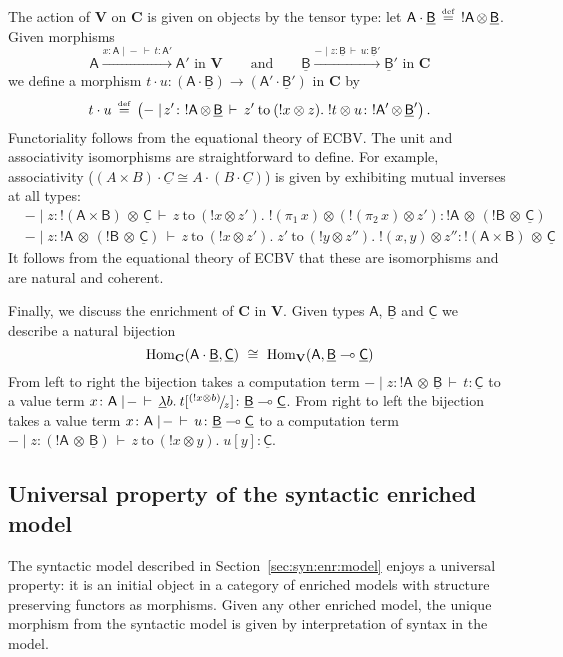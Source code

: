 \documentclass{LMCS}
\newcommand{\comptype}[1]{\underline{#1}}
\newcommand{\linlambda}{\comptype{\lambda}}
\newcommand{\co}{\colon}
\newcommand{\VA}{\mathsf{A}}
\newcommand{\VB}{\mathsf{B}}
\newcommand{\CB}{\comptype{\mathsf{B}}}
\newcommand{\CC}{\comptype{\mathsf{C}}}
\newcommand{\tensor}{\otimes}
\newcommand{\ltensortype}[2]{{!} #1 \, {\tensor} \, #2}
\newcommand{\llambda}{\linlambda}
\newcommand{\llam}[3]{\llambda #1.\: #3}
\newcommand{\ltensorterm}[2]{{!  #1} \tensor #2}
\newcommand{\letdot}[4]{{#3}\:\mathrm{to}\:{(\ltensorterm{#1}{#2})}.\;#4}
\newcommand{\rIn}[2]{#1 \colon  #2}
\newcommand{\aj}[4]{#1 \mid  \! #2 \, \vdash \, \rIn{#3}{#4}}
\newcommand{\tj}[3]{\aj{#1}{{-}}{#2}{#3}}
\newcommand{\VCat}{\fixedcatfont{V}} \newcommand{\CCat}{\fixedcatfont{C}} \newcommand{\DCat}{\fixedcatfont{D}}
\newcommand{\ltensor}[2]{#1 \cdot #2}
\newcommand{\fixedcatfont}{\mathbf}
\newcommand{\algC}{\underline{C}}
\newcommand{\defeq}{\mathrel{\,\stackrel{\mbox{\tiny{$\mathrm{def}$}}}=\,}}
\newcommand{\eecprojb}[2]{(\pi_{#1}\,#2)}
\newcommand{\sub}[3]{#1[^{#2}\!/\!_{#3}]}
\begin{document}
The action of $\VCat$ on $\CCat$ is given on objects by the tensor type: 
let $\ltensor \VA\CB\defeq \ltensortype\VA\CB$.
Given morphisms 
\[\VA\xrightarrow{\tj {x\co\VA}t{\VA'}}\VA'\text{ in $\VCat$}
\qquad\text{and}\qquad
\CB\xrightarrow{\aj-{z\co\CB}u{\CB'}}\CB'\text{ in $\CCat$}\]
we define a morphism $\ltensor t u:(\ltensor \VA\CB)\to(\ltensor {\VA'}{\CB'})$
in $\CCat$ by
\[\ltensor t u\defeq \left(\aj-{z'\co{\ltensortype \VA\CB}}{\letdot x{z}{z'}{\ltensorterm t u}}{\ltensortype{\VA'}{\CB'}}\right)\text.\]
Functoriality follows from the equational theory of ECBV.
The unit and associativity isomorphisms are straightforward to define.
For example, associativity ($\ltensor {(A\times B)}\algC\cong \ltensor A{(\ltensor B \algC)}$) is given by exhibiting
 mutual inverses at all types:
\begin{align*}
&\aj-{z\co{\ltensortype{(\VA\times \VB)}\CC}}
{\letdot x{z'} z {\ltensorterm{\eecprojb1x}{(\ltensorterm{\eecprojb2x}{z'})}}}
{\ltensortype \VA{(\ltensortype \VB\CC)}}
\\
&\aj-{z\co{\ltensortype \VA{(\ltensortype \VB\CC)}}}{\letdot x{z'} z {\letdot y{z''} {z'}{\ltensorterm{(x,y)}{z''}}}}{\ltensortype{(\VA\times \VB)}\CC}
\end{align*}
It follows from the 
equational theory of ECBV that these are isomorphisms and are natural and 
coherent.

Finally, we discuss the enrichment of $\CCat$ in $\VCat$.
Given types $\VA$, $\CB$ and $\CC$ we describe a natural bijection
\[
\Homset{\CCat}{\ltensor\VA\CB}{\CC} \ \cong\ \Homset{\VCat}{\VA}{\CB\lpop \CC}
\]
From left to right the bijection takes a 
computation term ${\aj-{z\co{\ltensortype\VA\CB}}t\CC}$
to a value term 
${\tj{x\co\VA}{\llam b{\CB} {\sub t{(\ltensorterm xb)}z}}{\CB\lpop\CC}}$.
From right to left the bijection takes a 
value term
${\tj{x\co\VA}{u}{\CB\lpop\CC}}$
to a computation term
${\aj-{z\co(\ltensortype\VA\CB)}{\letdot xy z{u[y]}}\CC}$.

\subsection{Universal property of the syntactic enriched model}
\label{sec:enr:model:biinitial}

The syntactic model described in Section~\ref{sec:syn:enr:model} enjoys a universal property:
it is an initial object 
in a category of enriched models with structure preserving
functors as morphisms. Given any other enriched model, the unique morphism
from the syntactic model is given by interpretation of syntax in the model.
\end{document}
